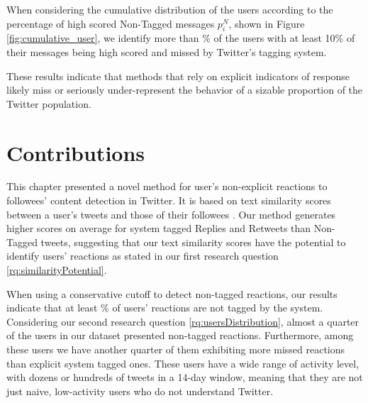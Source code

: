 When considering the cumulative distribution of the users according to the percentage of high scored Non-Tagged messages $p_i^N$, shown in Figure \ref{fig:cumulative_user}, we identify more than \usersMoreThanTenPctPct{}\% of the users with at least 10\% of their messages being high scored and missed by Twitter's tagging system. 

These results indicate that methods that rely on explicit indicators of response likely miss or seriously under-represent the behavior of a sizable proportion of the Twitter population.

\section{Contributions}

This chapter presented a novel method for user's non-explicit reactions to followees' content detection in Twitter. It is based on text similarity scores between a user's tweets and those of their followees \cite{Barbosa}.  Our method generates higher scores on average for system tagged Replies and Retweets than Non-Tagged tweets, suggesting that our text similarity scores have the potential to identify users' reactions as stated in our first research question \ref{rq:similarityPotential}.  

When using a conservative cutoff to detect non-tagged reactions, our results indicate that at least \highNonTaggedTweetCountPct{}\% of users' reactions are not tagged by the system.  Considering our second research question \ref{rq:usersDistribution}, almost a quarter of the users in our dataset presented non-tagged reactions. Furthermore, among these users we have another quarter of them exhibiting more missed reactions than explicit system tagged ones. These users have a wide range of activity level, with dozens or hundreds of tweets in a 14-day window, meaning that they are not just naive, low-activity users who do not understand Twitter.
